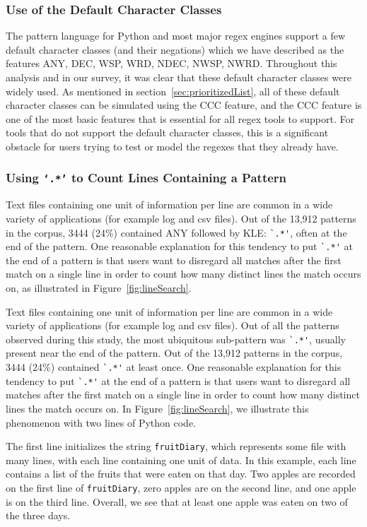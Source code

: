 \subsubsection{Use of the Default Character Classes}
The pattern language for Python and most major regex engines support a few default character classes (and their negations) which we have described as the features ANY, DEC, WSP, WRD, NDEC, NWSP, NWRD.  Throughout this analysis and in our survey,  it was clear that these default character classes were widely used.  As mentioned in section~\ref{sec:prioritizedList}, all of these default character classes can be simulated using the CCC feature, and the CCC feature is one of the most basic features that is essential for all regex tools to support.  For tools that do not support the default character classes, this is a significant obstacle for users trying to test or model the regexes that they already have.

\subsubsection{Using {\tt`.*'} to Count Lines Containing a Pattern}
Text files containing one unit of information per line are common in a wide variety of applications (for example log and csv files).  Out of the 13,912 patterns in the corpus, 3444 (24\%) contained ANY followed by KLE: \verb!`.*'!, often at the end of the pattern.
One reasonable explanation for this tendency to put \verb!`.*'! at the end of a pattern is that users want to disregard all matches after the first match on a single line in order to count how many distinct lines the match occurs on, as illustrated in Figure~\ref{fig:lineSearch}.

Text files containing one unit of information per line are common in a wide variety of applications (for example log and csv files).  Out of all the patterns observed during this study, the most ubiquitous sub-pattern was \verb!`.*'!, usually present near the end of the pattern.  Out of the 13,912 patterns in the corpus, 3444 (24\%) contained \verb!`.*'! at least once.
One reasonable explanation for this tendency to put \verb!`.*'! at the end of a pattern is that users want to disregard all matches after the first match on a single line in order to count how many distinct lines the match occurs on.  In Figure~\ref{fig:lineSearch}, we illustrate this phenomenon with two lines of Python code.

The first line initializes the string {\tt fruitDiary}, which represents some file with many lines, with each line containing one unit of data.  In this example, each line contains a list of the fruits that were eaten on that day.  Two apples are recorded on the first line of {\tt fruitDiary}, zero apples are on the second line, and one apple is on the third line.  Overall, we see that at least one apple was eaten on two of the three days.

